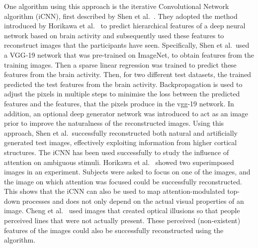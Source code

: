One algorithm using this approach is the iterative Convolutional Network algorithm (iCNN), first described by Shen et al.~\cite{shenDeepImageReconstruction2019}. They adopted the method introduced by Horikawa et al.~\cite{horikawaGenericDecodingSeen2017} to predict hierarchical features of a deep neural network based on brain activity and subsequently used these features to reconstruct images that the participants have seen. Specifically, Shen et al.\ used a VGG-19 network that was pre-trained on ImageNet, to obtain features from the training images. Then a sparse linear regression was trained to predict these features from the brain activity. Then, for two different test datasets, the trained  predicted the test features from the brain activity. Backpropagation is used to adjust the pixels in multiple steps to minimise the loss between the predicted features and the features, that the pixels produce in the vgg-19 network. In addition, an optional deep generator network was introduced to act as an image prior to improve the naturalness of the reconstructed images. Using this approach, Shen et al.\ successfully reconstructed both natural and artificially generated test images, effectively exploiting information from higher cortical structures. The iCNN has been used successfully to study the influence of attention on ambiguous stimuli. Horikawa et al.~\cite{horikawaAttentionModulatesNeural2022} showed two superimposed images in an experiment. Subjects were asked to focus on one of the images, and the image on which attention was focused could be successfully reconstructed. This shows that the iCNN can also be used to map attention-modulated top-down processes and does not only depend on the actual visual properties of an image. Cheng et al.~\cite{chengReconstructingVisualIllusory2023} used images that created optical illusions so that people perceived lines that were not actually present. These perceived (non-existent) features of the images could also be successfully reconstructed using the algorithm.

